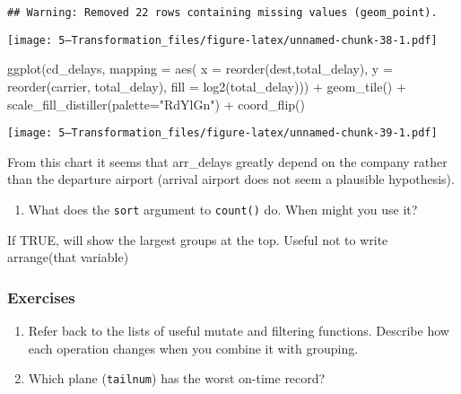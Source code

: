 \documentclass[
]{article}
\newenvironment{Shaded}{\begin{snugshade}}{\end{snugshade}}
\newcommand{\AttributeTok}[1]{\textcolor[rgb]{0.77,0.63,0.00}{#1}}
\newcommand{\FunctionTok}[1]{\textcolor[rgb]{0.00,0.00,0.00}{#1}}
\newcommand{\NormalTok}[1]{#1}
\newcommand{\SpecialCharTok}[1]{\textcolor[rgb]{0.00,0.00,0.00}{#1}}
\newcommand{\StringTok}[1]{\textcolor[rgb]{0.31,0.60,0.02}{#1}}
\providecommand{\tightlist}{%
  \setlength{\itemsep}{0pt}\setlength{\parskip}{0pt}}
\begin{document}
\begin{verbatim}
## Warning: Removed 22 rows containing missing values (geom_point).
\end{verbatim}

\texttt{[image: 5---Transformation\_files/figure-latex/unnamed-chunk-38-1.pdf]}

\begin{Shaded}
\begin{Highlighting}[]
\FunctionTok{ggplot}\NormalTok{(cd\_delays,}
       \AttributeTok{mapping =} \FunctionTok{aes}\NormalTok{( }\AttributeTok{x =} \FunctionTok{reorder}\NormalTok{(dest,total\_delay), }
                      \AttributeTok{y =} \FunctionTok{reorder}\NormalTok{(carrier, total\_delay),}
                      \AttributeTok{fill =} \FunctionTok{log2}\NormalTok{(total\_delay))) }\SpecialCharTok{+}
  \FunctionTok{geom\_tile}\NormalTok{() }\SpecialCharTok{+}
  \FunctionTok{scale\_fill\_distiller}\NormalTok{(}\AttributeTok{palette=}\StringTok{"RdYlGn"}\NormalTok{) }\SpecialCharTok{+}
  \FunctionTok{coord\_flip}\NormalTok{()}
\end{Highlighting}
\end{Shaded}

\texttt{[image: 5---Transformation\_files/figure-latex/unnamed-chunk-39-1.pdf]}

From this chart it seems that arr\_delays greatly depend on the company
rather than the departure airport (arrival airport does not seem a
plausible hypothesis).

\begin{enumerate}
\def\labelenumi{\arabic{enumi}.}
\tightlist
\item
  What does the \texttt{sort} argument to \texttt{count()} do. When
  might you use it?
\end{enumerate}

If TRUE, will show the largest groups at the top. Useful not to write
arrange(that variable)

\hypertarget{exercises-5}{%
\subsubsection{Exercises}\label{exercises-5}}

\begin{enumerate}
\def\labelenumi{\arabic{enumi}.}
\item
  Refer back to the lists of useful mutate and filtering functions.
  Describe how each operation changes when you combine it with grouping.
\item
  Which plane (\texttt{tailnum}) has the worst on-time record?
\end{enumerate}
\end{document}
